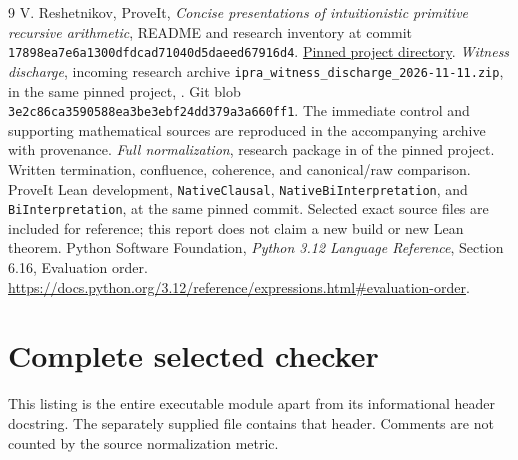 \documentclass[11pt,letterpaper]{article}
\theoremstyle{definition}
\begin{document}
\begin{thebibliography}{9}
 V. Reshetnikov, ProveIt, \emph{Concise presentations of
intuitionistic primitive recursive arithmetic}, README and research
inventory at commit \texttt{17898ea7e6a1300dfdcad71040d5daeed67916d4}.
\href{https://github.com/VladimirReshetnikov/ProveIt/tree/17898ea7e6a1300dfdcad71040d5daeed67916d4/Logic/PrimitiveRecursiveArithmetic/ConciseIPRA}{Pinned project directory}.
 \emph{Witness discharge}, incoming research archive
\texttt{ipra\_witness\_discharge\_2026-11-11.zip}, in the same pinned
project, .  Git blob
\texttt{3e2c86ca3590588ea3be3ebf24dd379a3a660ff1}.
The immediate control and supporting mathematical sources are reproduced
in the accompanying archive with provenance.
 \emph{Full normalization}, research package in
 of the pinned project.  Written
termination, confluence, coherence, and canonical/raw comparison.
 ProveIt Lean development, \texttt{NativeClausal},
\texttt{NativeBiInterpretation}, and \texttt{BiInterpretation}, at the
same pinned commit.  Selected exact source files are included for
reference; this report does not claim a new build or new Lean theorem.
 Python Software Foundation, \emph{Python 3.12 Language
Reference}, Section 6.16, Evaluation order.
\url{https://docs.python.org/3.12/reference/expressions.html#evaluation-order}.
\end{thebibliography}

\appendix

\section{Complete selected checker}\label{app:source}

This listing is the entire executable module apart from its informational header docstring. The separately supplied file contains that header. Comments are not counted by the source normalization metric.
\end{document}
